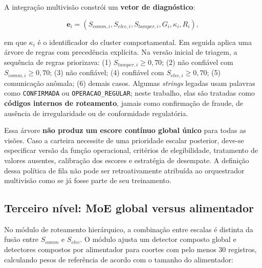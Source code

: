 A integração multivisão constrói um \textbf{vetor de diagnóstico}:

\[\mathbf e_i=(S_{comm,i},S_{elec,i},S_{tamper,i},G_i,\kappa_i,R_i),\]

em que \(\kappa_i\) é o identificador do cluster comportamental. Em seguida aplica uma árvore de regras com precedência explícita. Na versão inicial de triagem, a sequência de regras priorizava: (1) \(S_{tamper,i}\ge0{,}70\); (2) não confiável com \(S_{comm,i}\ge0{,}70\); (3) não confiável; (4) confiável com \(S_{elec,i}\ge0{,}70\); (5) comunicação anômala; (6) demais casos. Algumas \emph{strings} legadas usam palavras como \texttt{CONFIRMADA} ou \texttt{OPERACAO\_REGULAR}; neste trabalho, elas são tratadas como \textbf{códigos internos de roteamento}, jamais como confirmação de fraude, de ausência de irregularidade ou de conformidade regulatória.

Essa árvore \textbf{não produz um escore contínuo global único} para todas as visões. Caso a carteira necessite de uma prioridade escalar posterior, deve-se especificar versão da função operacional, critérios de elegibilidade, tratamento de valores ausentes, calibração dos escores e estratégia de desempate. A definição dessa política de fila não pode ser retroativamente atribuída ao orquestrador multivisão como se já fosse parte de seu treinamento.

\subsection{Terceiro nível: MoE global versus alimentador}\label{terceiro-nuxedvel-moe-global-versus-alimentador}

No módulo de roteamento hierárquico, a combinação entre escalas é distinta da fusão entre \(S_{comm}\) e \(S_{elec}\). O módulo ajusta um detector composto global e detectores compostos por alimentador para coortes com pelo menos 30 registros, calculando pesos de referência de acordo com o tamanho do alimentador:

